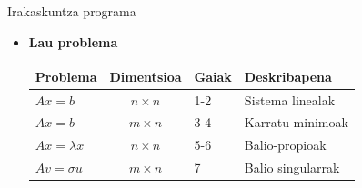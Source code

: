 \documentclass[
 10pt,%
 compress,%
 t,       %
 xcolor=svgnames
]{beamer}
\theoremstyle{definition} \newtheorem{definicion}{Definicion}[section]
\theoremstyle{propiedades} \newtheorem{propiedades}{Propiedades}[section]
\begin{document}
\begin{frame}{Irakaskuntza programa}
\begin{itemize}
\begin{columns}
	
	
	
\end{columns}


\bigskip
		
		\item \textbf{Lau problema}
		
		\medskip
		\begin{table} [h!]
			\centering
			\begin{tabular}{ l c l l } 
				Problema & Dimentsioa & Gaiak & Deskribapena \\	
				\hline 
				$Ax=b$ & $n \times n$ & 1-2  & Sistema linealak \\
				$Ax=b$ & $m \times n$ & 3-4  & Karratu minimoak \\
				$Ax=\lambda x$ & $n \times n$  & 5-6  &  Balio-propioak  \\
				\color{black}$Av=\sigma u$ & \color{black}$m \times n$  & \color{black}7  & \color{black} Balio singularrak \\ 
				\hline
			\end{tabular}
		\end{table}
		\bigskip
		
		
		
		
		\ %
		
	\end{itemize}
	
	
\end{frame}
\end{document}
